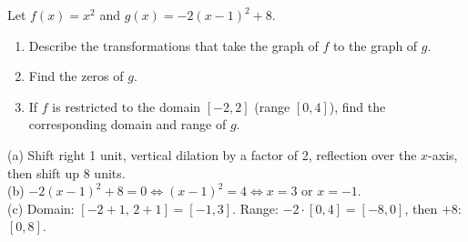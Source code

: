 \begin{exo}{}
Let $f(x)=x^2$ and $g(x)=-2(x-1)^2+8$.
\begin{enumerate}[label=(\alph*)]
\item Describe the transformations that take the graph of $f$ to the graph of $g$.
\item Find the zeros of $g$.
\item If $f$ is restricted to the domain $[-2,2]$ (range $[0,4]$), find the corresponding domain and range of $g$.
\end{enumerate}
\begin{solution}
(a) Shift right 1 unit, vertical dilation by a factor of 2, reflection over the $x$-axis, then shift up 8 units.\\
(b) $-2(x-1)^2+8=0 \iff (x-1)^2=4 \iff x=3$ or $x=-1$.\\
(c) Domain: $[-2+1,\,2+1]=[-1,3]$. Range: $-2\cdot[0,4]=[-8,0]$, then $+8$: $[0,8]$.
\end{solution}
\end{exo}

